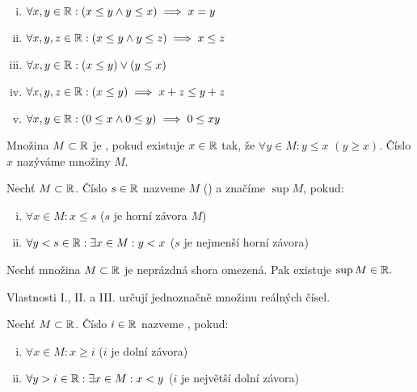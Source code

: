 \begin{remark}
    \leavevmode
    \begin{enumerate}[i.]
        \item $\forall x,y \in \mathbb{R}: (x \leq y \land y \leq x) \implies x = y$
        \item $\forall x,y,z \in \mathbb{R}: (x \leq y \land y \leq z) \implies 
            x \leq z$
        \item $\forall x,y \in \mathbb{R}: (x \leq y) \lor (y \leq x)$
        \item $\forall x,y,z \in \mathbb{R}: (x \leq y) \implies x + z \leq y + z$
        \item $\forall x,y \in \mathbb{R}: (0 \leq x \land 0 \leq y) \implies
            0 \leq xy$
    \end{enumerate}
\end{remark}

\begin{definition}
    Množina $M \subset \mathbb{R}$ je , pokud
    existuje $x \in \mathbb{R}$ tak, že $\forall y \in M: y \leq x$ $(y \geq x)$.
    Číslo $x$ nazýváme  množiny $M$.
\end{definition}

\begin{definition}
    Nechť $M \subset \mathbb{R}$. Číslo $s \in \mathbb{R}$ nazveme  $M$
    () a značíme $\sup M$, pokud:
    \begin{enumerate}[i.]
        \item $\forall x \in M: x \leq s$ ($s$ je horní závora $M$)
        \item $\forall y < s \in \mathbb{R}: \exists x \in M: y < x$ ($s$ je 
            nejmenší horní závora)
    \end{enumerate}
\end{definition}

\begin{remark}
    Nechť množina $M \subset \mathbb{R}$ je neprázdná shora omezená. Pak existuje 
    $\sup M \in \mathbb{R}.$
\end{remark}

Vlastnosti I., II. a III. určují jednoznačně množinu reálných čísel.

\begin{definition}
    \label{def:inf}
    Nechť $M \subset \mathbb{R}$. Číslo $i \in \mathbb{R}$ nazveme , pokud:
    \begin{enumerate}[i.]
        \item $\forall x \in M: x \geq i$ ($i$ je dolní závora)
        \item $\forall y > i \in \mathbb{R}: \exists x \in M: x < y$ ($i$ je největší
            dolní závora)
    \end{enumerate}
\end{definition}

